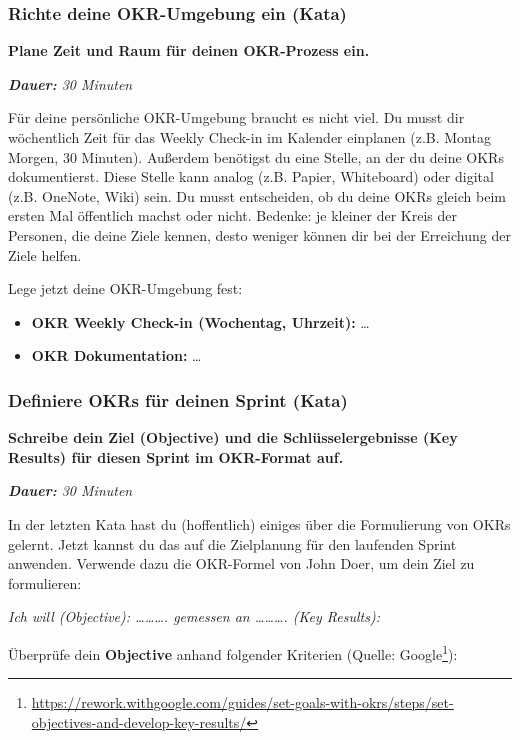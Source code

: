 \documentclass[
  ngerman,
  paper=a4,
,captions=tableheading
]{scrartcl}
\DeclareRobustCommand{\href}[2]{#2\footnote{\url{#1}}}
\providecommand{\tightlist}{%
  \setlength{\itemsep}{0pt}\setlength{\parskip}{0pt}}
\begin{document}
\hypertarget{richte-deine-okr-umgebung-ein-kata}{%
\subsubsection{Richte deine OKR-Umgebung ein
(Kata)}\label{richte-deine-okr-umgebung-ein-kata}}

\textbf{Plane Zeit und Raum für deinen OKR-Prozess ein.}

\emph{\textbf{Dauer:} 30 Minuten}

Für deine persönliche OKR-Umgebung braucht es nicht viel. Du musst dir
wöchentlich Zeit für das Weekly Check-in im Kalender einplanen (z.B.
Montag Morgen, 30 Minuten). Außerdem benötigst du eine Stelle, an der du
deine OKRs dokumentierst. Diese Stelle kann analog (z.B. Papier,
Whiteboard) oder digital (z.B. OneNote, Wiki) sein. Du musst
entscheiden, ob du deine OKRs gleich beim ersten Mal öffentlich machst
oder nicht. Bedenke: je kleiner der Kreis der Personen, die deine Ziele
kennen, desto weniger können dir bei der Erreichung der Ziele helfen.

Lege jetzt deine OKR-Umgebung fest:

\begin{itemize}
\tightlist
\item
  \textbf{OKR Weekly Check-in (Wochentag, Uhrzeit):} \ldots{}
\item
  \textbf{OKR Dokumentation:} \ldots{}
\end{itemize}

\hypertarget{definiere-okrs-fuxfcr-deinen-sprint-kata}{%
\subsubsection{Definiere OKRs für deinen Sprint
(Kata)}\label{definiere-okrs-fuxfcr-deinen-sprint-kata}}

\textbf{Schreibe dein Ziel (Objective) und die Schlüsselergebnisse (Key
Results) für diesen Sprint im OKR-Format auf.}

\emph{\textbf{Dauer:} 30 Minuten}

In der letzten Kata hast du (hoffentlich) einiges über die Formulierung
von OKRs gelernt. Jetzt kannst du das auf die Zielplanung für den
laufenden Sprint anwenden. Verwende dazu die OKR-Formel von John Doer,
um dein Ziel zu formulieren:

\emph{Ich will (Objective): \ldots\ldots\ldots. gemessen an
\ldots\ldots\ldots. (Key Results):}

Überprüfe dein \textbf{Objective} anhand folgender Kriterien (Quelle:
\href{https://rework.withgoogle.com/guides/set-goals-with-okrs/steps/set-objectives-and-develop-key-results/}{Google}):
\end{document}
